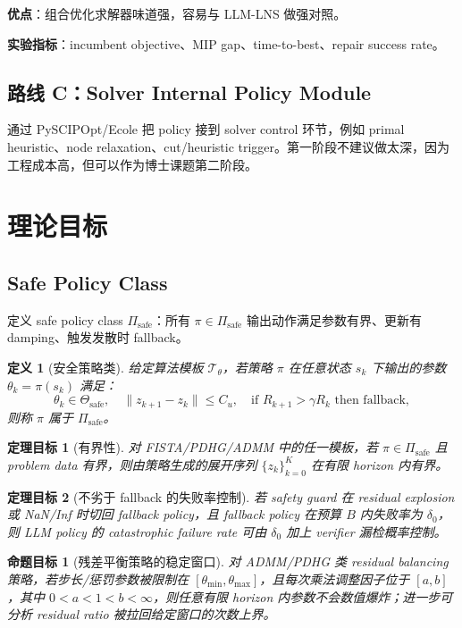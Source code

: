 \documentclass[12pt,a4paper]{ctexart}
\newtheorem{definition}{定义}
\newtheorem{theorem}{定理目标}
\newtheorem{proposition}{命题目标}
\begin{document}
\textbf{优点}：组合优化求解器味道强，容易与 LLM-LNS 做强对照。

\textbf{实验指标}：incumbent objective、MIP gap、time-to-best、repair success rate。

\subsection{路线 C：Solver Internal Policy Module}
通过 PySCIPOpt/Ecole 把 policy 接到 solver control 环节，例如 primal heuristic、node relaxation、cut/heuristic trigger。第一阶段不建议做太深，因为工程成本高，但可以作为博士课题第二阶段。

\section{理论目标}

\subsection{Safe Policy Class}
定义 safe policy class $\Pi_{\mathrm{safe}}$：所有 $\pi\in\Pi_{\mathrm{safe}}$ 输出动作满足参数有界、更新有 damping、触发发散时 fallback。

\begin{definition}[安全策略类]
给定算法模板 $\mathcal{T}_{\theta}$，若策略 $\pi$ 在任意状态 $s_k$ 下输出的参数 $\theta_k=\pi(s_k)$ 满足：
\begin{equation}
    \theta_k\in\Theta_{\mathrm{safe}}, \quad
    \|z_{k+1}-z_k\|\le C_u, \quad
    \text{if } R_{k+1}>\gamma R_k \text{ then fallback},
\end{equation}
则称 $\pi$ 属于 $\Pi_{\mathrm{safe}}$。
\end{definition}

\begin{theorem}[有界性]
对 FISTA/PDHG/ADMM 中的任一模板，若 $\pi\in\Pi_{\mathrm{safe}}$ 且 problem data 有界，则由策略生成的展开序列 $\{z_k\}_{k=0}^{K}$ 在有限 horizon 内有界。
\end{theorem}

\begin{theorem}[不劣于 fallback 的失败率控制]
若 safety guard 在 residual explosion 或 NaN/Inf 时切回 fallback policy，且 fallback policy 在预算 $B$ 内失败率为 $\delta_0$，则 LLM policy 的 catastrophic failure rate 可由 $\delta_0$ 加上 verifier 漏检概率控制。
\end{theorem}

\begin{proposition}[残差平衡策略的稳定窗口]
对 ADMM/PDHG 类 residual balancing 策略，若步长/惩罚参数被限制在 $[\theta_{\min},\theta_{\max}]$，且每次乘法调整因子位于 $[a,b]$，其中 $0<a<1<b<\infty$，则任意有限 horizon 内参数不会数值爆炸；进一步可分析 residual ratio 被拉回给定窗口的次数上界。
\end{proposition}
\end{document}
